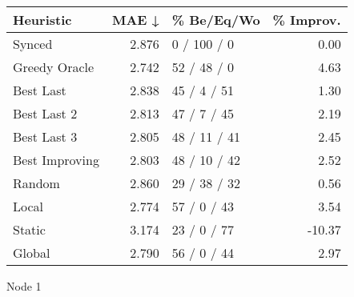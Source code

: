 \begin{tabular}{lrlr}
\toprule
\textbf{Heuristic} & \textbf{MAE ↓} & \textbf{\% Be/Eq/Wo} & \textbf{\% Improv.} \\
\midrule
            Synced &          2.876 &          0 / 100 / 0 &                0.00 \\
     Greedy Oracle &          2.742 &          52 / 48 / 0 &                4.63 \\
         Best Last &          2.838 &          45 / 4 / 51 &                1.30 \\
       Best Last 2 &          2.813 &          47 / 7 / 45 &                2.19 \\
       Best Last 3 &          2.805 &         48 / 11 / 41 &                2.45 \\
    Best Improving &          2.803 &         48 / 10 / 42 &                2.52 \\
            Random &          2.860 &         29 / 38 / 32 &                0.56 \\
             Local &          2.774 &          57 / 0 / 43 &                3.54 \\
            Static &          3.174 &          23 / 0 / 77 &              -10.37 \\
            Global &          2.790 &          56 / 0 / 44 &                2.97 \\
\bottomrule
\end{tabular}
\caption{Node 1}
\label{tab:ds_non_lr05_le2_bs4_1}
